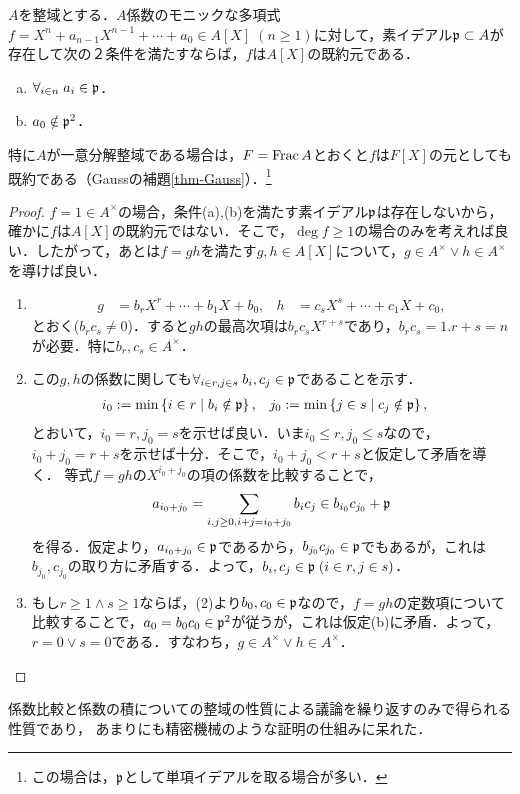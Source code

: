 \documentclass[uplatex,dvipdfmx]{jsreport}
\begin{document}
\begin{theorem}[Eisensteinの既約判定法]\label{thm-Eisenstein}
    $A$を整域とする．$A$係数のモニックな多項式$f=X^n+a_{n-1}X^{n-1}+\cdots+a_0\in A[X]\;(n\ge 1)$に対して，素イデアル$\mathfrak{p}\subset A$が存在して次の２条件を満たすならば，$f$は$A[X]$の既約元である．
    \begin{enumerate}[(a)]
        \item $\forall_{i\in n}\;a_i\in\mathfrak{p}$．
        \item $a_0\notin\mathfrak{p}^2$．
    \end{enumerate}
    特に$A$が一意分解整域である場合は，$F=\mathrm{Frac}\, A$とおくと$f$は$F[X]$の元としても既約である（Gaussの補題\ref{thm-Gauss}）．\footnote{この場合は，$\mathfrak{p}$として単項イデアルを取る場合が多い．}
\end{theorem}
\begin{proof}
    $f=1\in A^\times$の場合，条件(a),(b)を満たす素イデアル$\mathfrak{p}$は存在しないから，確かに$f$は$A[X]$の既約元ではない．そこで，$\deg f\ge 1$の場合のみを考えれば良い．したがって，あとは$f=gh$を満たす$g,h\in A[X]$について，$g\in A^\times\lor h\in A^\times$を導けば良い．
    \begin{enumerate}
        \item \begin{align*}
            g&=b_rX^r+\cdots+b_1X+b_0,&h&=c_sX^s+\cdots+c_1X+c_0,
        \end{align*}
        とおく($b_rc_s\ne 0$)．すると$gh$の最高次項は$b_rc_sX^{r+s}$であり，$b_rc_s=1.r+s=n$が必要．特に$b_r,c_s\in A^\times$．
        \item この$g,h$の係数に関しても$\forall_{i\in r,j\in s}\;b_i,c_j\in\mathfrak{p}$であることを示す．
        \begin{align*}
            i_0&:=\min\left\{i\in r\mid b_i\notin\mathfrak{p}\right\},&j_0&:=\min\left\{j\in s\mid c_j\notin\mathfrak{p}\right\},
        \end{align*}
        とおいて，$i_0=r,j_0=s$を示せば良い．いま$i_0\le r,j_0\le s$なので，$i_0+j_0=r+s$を示せば十分．そこで，$i_0+j_0<r+s$と仮定して矛盾を導く．
        等式$f=gh$の$X^{i_0+j_0}$の項の係数を比較することで，
        \[a_{i_0+j_0}=\sum_{i,j\ge0,i+j=i_0+j_0}b_ic_j\in b_{i_0}c_{j_0}+\mathfrak{p}\]
        を得る．仮定より，$a_{i_0+j_0}\in\mathfrak{p}$であるから，$b_{j_0}c_{j_0}\in\mathfrak{p}$でもあるが，これは$b_{j_0},c_{j_0}$の取り方に矛盾する．よって，$b_i,c_j\in\mathfrak{p}\;(i\in r,j\in s)$．
        \item もし$r\ge 1\land s\ge 1$ならば，(2)より$b_0,c_0\in\mathfrak{p}$なので，$f=gh$の定数項について比較することで，$a_0=b_0c_0\in\mathfrak{p}^2$が従うが，これは仮定(b)に矛盾．よって，$r=0\lor s=0$である．すなわち，$g\in A^\times\lor h\in A^\times$．
    \end{enumerate}
\end{proof}
\begin{remarks}
    係数比較と係数の積についての整域の性質による議論を繰り返すのみで得られる性質であり，
    あまりにも精密機械のような証明の仕組みに呆れた．
\end{remarks}
\end{document}
